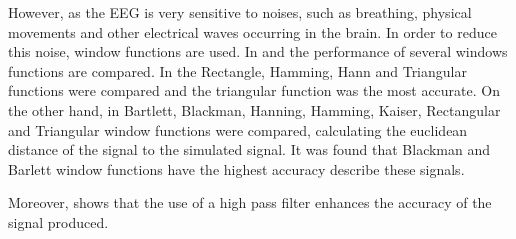 However, as the EEG is very sensitive to noises, such as breathing, physical movements and other electrical waves occurring in the brain. In order to reduce this noise, window functions are used. In \cite{EEGwindowfunc1} and \cite{EEGwindowfunc3} the performance of several windows functions are compared. In \cite{EEGwindowfunc1} the Rectangle, Hamming, Hann and Triangular functions were compared and the triangular function was the most accurate. On the other hand, in \cite{EEGwindowfunc2} Bartlett, Blackman, Hanning, Hamming, Kaiser, Rectangular and Triangular window functions were compared, calculating the euclidean distance of the signal to the simulated signal. It was found that Blackman and Barlett window functions have the highest accuracy describe these signals.

Moreover, \cite{EEGwindowfunc1} shows that the use of a high pass filter enhances the accuracy of the signal produced.

